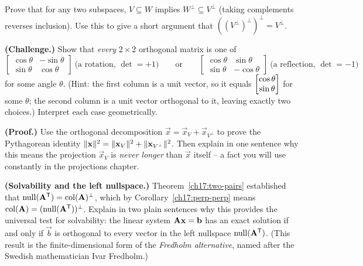 \begin{exercise}\label{ch17:ex-perp-perp-proof}
Prove that for any two subspaces, $V\subseteq W$ implies $W^\perp\subseteq V^\perp$ (taking
complements reverses inclusion). Use this to give a short argument that $((V^\perp)^\perp)^\perp=V^\perp$.
\end{exercise}

\begin{exercise}\label{ch17:ex-challenge-rotation}
\textbf{(Challenge.)} Show that \emph{every} $2\times2$ orthogonal matrix is one of
\[
  \begin{bmatrix}\cos\theta&-\sin\theta\\\sin\theta&\cos\theta\end{bmatrix}
  \ \text{(a rotation, $\det=+1$)}
  \qquad\text{or}\qquad
  \begin{bmatrix}\cos\theta&\sin\theta\\\sin\theta&-\cos\theta\end{bmatrix}
  \ \text{(a reflection, $\det=-1$)}
\]
for some angle $\theta$. (Hint: the first column is a unit vector, so it equals
$\begin{bmatrix}\cos\theta\\\sin\theta\end{bmatrix}$ for some $\theta$; the second column is a unit vector orthogonal
to it, leaving exactly two choices.) Interpret each case geometrically.
\end{exercise}

\begin{exercise}\label{ch17:ex-proof-distance}
\textbf{(Proof.)} Use the orthogonal decomposition $\vec x=\vec x_V+\vec x_{V^\perp}$ to prove the
Pythagorean identity $\lVert\mathbf{x}\rVert^2=\lVert\mathbf{x}_V\rVert^2+\lVert\mathbf{x}_{V^\perp}\rVert^2$. Then explain in
one sentence why this means the projection $\vec x_V$ is \emph{never longer} than $\vec x$ itself --
a fact you will use constantly in the projections chapter.
\end{exercise}

\begin{exercise}\label{ch17:ex-fredholm-solvability}
\textbf{(Solvability and the left nullspace.)}
Theorem~\ref{ch17:two-pairs} established that $\operatorname{null}(\mathbf{A}^{\mathsf{T}}) = \operatorname{col}(\mathbf{A})^\perp$, which by
Corollary~\ref{ch17:perp-perp} means $\operatorname{col}(\mathbf{A}) = (\operatorname{null}(\mathbf{A}^{\mathsf{T}}))^\perp$. Explain in two
plain sentences why this provides the universal test for solvability: the linear system
$\mathbf{A}\mathbf{x} = \mathbf{b}$ has an exact solution if and only if $\vec b$ is orthogonal to every vector
in the left nullspace $\operatorname{null}(\mathbf{A}^{\mathsf{T}})$. (This result is the finite-dimensional form of the
\emph{Fredholm alternative}, named after the Swedish mathematician Ivar Fredholm.)
\end{exercise}
